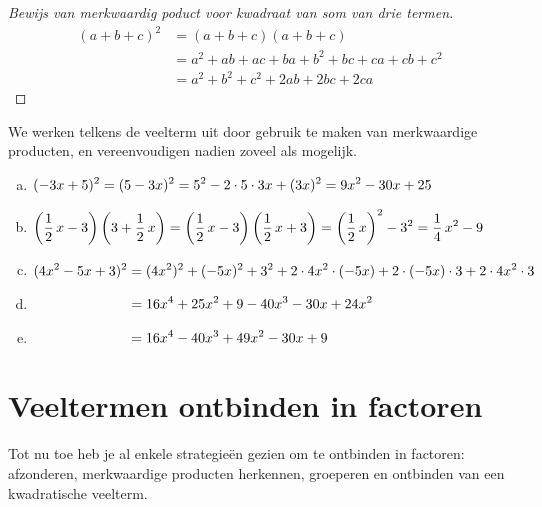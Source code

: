 \documentclass{ximera}
\begin{document}
\begin{proof}[Bewijs van merkwaardig poduct voor kwadraat van som van drie termen]

\begin{align}
(a+b+c)^2 
& = (a+b+c)(a+b+c) \nonumber \\
& = a^2 + ab + ac + ba + b^2 + bc + ca + cb + c^2 \nonumber \\
& = a^2 + b^2 + c^2 + 2ab + 2bc + 2ca \tag*{\qedhere}
\end{align}

\end{proof}


\begin{example} 
We werken telkens de veelterm uit door gebruik te maken van merkwaardige producten, en vereenvoudigen nadien zoveel als mogelijk.
\begin{enumerate}[(a)]
\item 
$\displaystyle (-3x+5)^2 = (5-3x)^2 = 5^2 - 2 \cdot 5 \cdot 3x + (3x)^2 = 9x^2 - 30x + 25$
\item 
$\displaystyle \left(\frac{1}{2}\,x-3\right)\left(3+\frac{1}{2}\,x\right) = \left(\frac{1}{2}\,x-3\right)\left(\frac{1}{2}\,x+3\right) = \left(\frac{1}{2}\,x\right)^2 - 3^2 = \frac{1}{4}\,x^2 - 9$
\item
$\displaystyle (4x^2 - 5x + 3)^2 = (4x^2)^2 + (-5x)^2 + 3^2 + 2 \cdot 4x^2 \cdot (-5x) + 2\cdot (-5x) \cdot 3 + 2 \cdot 4x^2 \cdot 3$
\item[]
$\D \mph{(4x^2 - 5x + 3)^2} = 16x^4 + 25x^2 + 9 -40x^3 - 30x + 24x^2$
\item[]
$\D \mph{(4x^2 - 5x + 3)^2} = 16x^4 - 40x^3 + 49x^2 - 30x + 9$
\end{enumerate}
\end{example} 














\section{Veeltermen ontbinden in factoren}

Tot nu toe heb je al enkele strategie\"en gezien om te ontbinden in factoren: afzonderen, merkwaardige producten herkennen, groeperen en ontbinden van een kwadratische veelterm.
\end{document}
